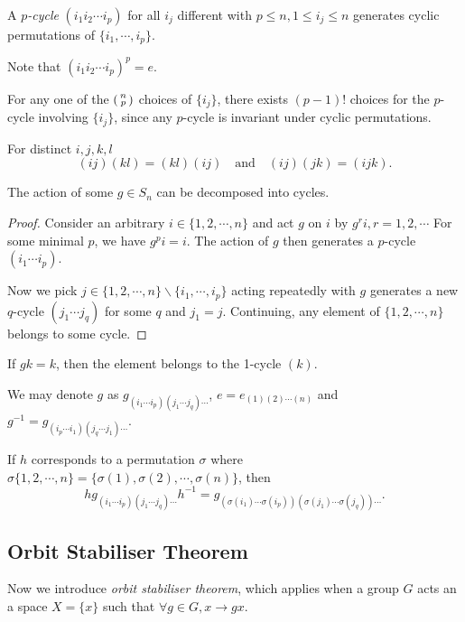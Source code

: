\documentclass[a4paper,11pt]{article}
\begin{document}
	\begin{defi}
		A \emph{$p$-cycle} $(i_1 i_2 \cdots i_p)$ for all $i_j$ different with $p \leq n, 1 \leq i_j \leq n$ generates cyclic permutations of $\{i_1, \cdots, i_p\}$. 
	\end{defi}

	Note that $(i_1 i_2 \cdots i_p)^p = e$.

	For any one of the $\rk{n}{p}$ choices of $\{i_j\}$, there exists $(p-1)!$ choices for the $p$-cycle involving $\{i_j\}$, since any $p$-cycle is invariant under cyclic permutations.

	For distinct $i,j,k,l$
	\[
		(ij)(kl) = (kl)(ij) \quad \text{and} \quad (ij) (jk) = (ijk).
	\]
	
	\begin{prop}
		The action of some $g \in S_n$ can be decomposed into cycles.
	\end{prop}

	\begin{proof}
		Consider an arbitrary $i \in \{1,2,\cdots, n\}$ and act $g$ on $i$ by $g^r i, r = 1,2,\cdots$ For some minimal $p$, we have $g^p i = i$. The action of $g$ then generates a $p$-cycle $(i_1 \cdots i_p)$. 
	
		Now we pick $j\in \{1,2,\cdots,n\} \backslash \{i_1, \cdots, i_p\}$ acting repeatedly with $g$ generates a new $q$-cycle $(j_1 \cdots j_q)$ for some $q$ and $j_1 = j$. Continuing, any element of $\{1,2,\cdots,n\}$ belongs to some cycle.
	\end{proof}

	If $gk = k$, then the element belongs to the 1-cycle $(k)$.

	We may denote $g$ as $g_{(i_1 \cdots i_p)(j_1 \cdots j_q)\cdots}$, $e = e_{(1)(2)\cdots(n)}$ and $g^{-1} = g_{(i_p \cdots i_1)(j_q \cdots j_1)\cdots}$.
	
	If $h$ corresponds to a permutation $\sigma$ where $\sigma \{1,2,\cdots,n\} = \{\sigma(1),\sigma(2),\cdots, \sigma(n)\}$, then
	\[
		h g_{(i_1 \cdots i_p)(j_1 \cdots j_q)\cdots}h^{-1} = g_{(\sigma(i_1)\cdots \sigma(i_p))(\sigma(j_1)\cdots \sigma(j_q))\cdots}.
	\]

	\subsection{Orbit Stabiliser Theorem}

	Now we introduce \emph{orbit stabiliser theorem}, which applies when a group $G$ acts an a space $X = \{x\}$ such that $\forall g \in G, x \to gx$. 
\end{document}
